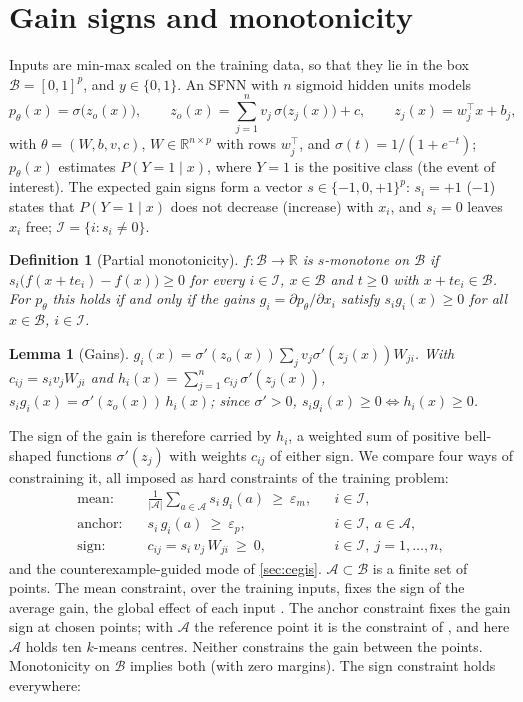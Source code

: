 \documentclass[preprint,12pt,authoryear]{elsarticle}
\newtheorem{definition}{Definition}
\newtheorem{lemma}{Lemma}
\newcommand{\R}{\mathbb{R}}
\newcommand{\B}{\mathcal{B}}
\newcommand{\I}{\mathcal{I}}
\newcommand{\A}{\mathcal{A}}
\newcommand{\sig}{\sigma}
\begin{document}
\section{Gain signs and monotonicity}\label{sec:problem}

Inputs are min-max scaled on the training data, so that they lie in the box $\B=[0,1]^p$, and $y\in\{0,1\}$. An SFNN
with $n$ sigmoid hidden units models
\begin{equation}\label{eq:slfn}
p_\theta(x)=\sig\bigl(z_o(x)\bigr),\qquad z_o(x)=\sum_{j=1}^{n} v_j\,\sig\bigl(z_j(x)\bigr)+c,\qquad z_j(x)=w_j^\top x+b_j ,
\end{equation}
with $\theta=(W,b,v,c)$, $W\in\R^{n\times p}$ with rows $w_j^\top$, and $\sig(t)=1/(1+e^{-t})$; $p_\theta(x)$ estimates
$P(Y=1\mid x)$, where $Y=1$ is the positive class (the event of interest). The expected gain signs form a vector
$s\in\{-1,0,+1\}^p$: $s_i=+1$ ($-1$) states that $P(Y=1\mid x)$ does not decrease (increase) with $x_i$, and $s_i=0$
leaves $x_i$ free; $\I=\{i:s_i\neq0\}$.

\begin{definition}[Partial monotonicity]\label{def:mono}
$f:\B\to\R$ is \emph{$s$-monotone on $\B$} if $s_i\bigl(f(x+te_i)-f(x)\bigr)\ge0$ for every $i\in\I$, $x\in\B$ and $t\ge0$
with $x+te_i\in\B$. For $p_\theta$ this holds if and only if the \emph{gains} $g_i=\partial p_\theta/\partial x_i$
satisfy $s_ig_i(x)\ge0$ for all $x\in\B$, $i\in\I$.
\end{definition}

\begin{lemma}[Gains]\label{lem:gain}
$g_i(x)=\sig'(z_o(x))\sum_{j}v_j\sig'(z_j(x))W_{ji}$. With $c_{ij}=s_iv_jW_{ji}$ and
$h_i(x)=\sum_{j=1}^{n}c_{ij}\,\sig'(z_j(x))$, $s_ig_i(x)=\sig'(z_o(x))\,h_i(x)$; since $\sig'>0$, $s_ig_i(x)\ge0\iff h_i(x)\ge0$.
\end{lemma}

The sign of the gain is therefore carried by $h_i$, a weighted sum of positive bell-shaped functions $\sig'(z_j)$ with
weights $c_{ij}$ of either sign. We compare four ways of constraining it, all imposed as hard constraints of the training
problem:
\begin{align}
\text{mean:}\quad & \frac{1}{|\A|}\sum_{a\in\A}s_i\,g_i(a)\ \ge\ \varepsilon_{m}, && i\in\I, \label{eq:mean}\\
\text{anchor:}\quad & s_i\,g_i(a)\ \ge\ \varepsilon_{p}, && i\in\I,\ a\in\A, \label{eq:point}\\
\text{sign:}\quad & c_{ij}=s_i\,v_j\,W_{ji}\ \ge\ 0, && i\in\I,\ j=1,\dots,n, \label{eq:sign}
\end{align}
and the counterexample-guided mode of \cref{sec:cegis}. $\A\subset\B$ is a finite set of points. The mean constraint,
over the training inputs, fixes the sign of the average gain, the global effect of each input \citep{HardleStoker1989}.
The anchor constraint fixes the gain sign at chosen points; with $\A$ the reference point it is the constraint of
\citet{Sa2026}, and here $\A$ holds ten $k$-means centres. Neither constrains the gain between the points. Monotonicity
on $\B$ implies both (with zero margins). The sign constraint holds everywhere:
\end{document}
